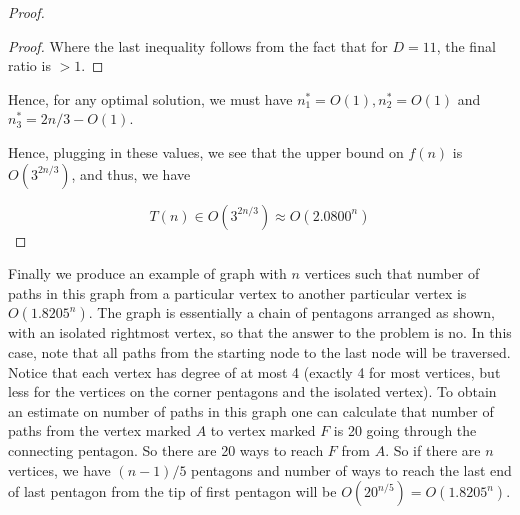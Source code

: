 \documentclass[answers]{exam}
\begin{document}
\begin{questions}
\begin{solution}
\begin{proof}
\begin{proof}
    Where the last inequality follows from the fact that for $D = 11$, the final ratio is $>1$.
\end{proof}

Hence, for any optimal solution, we must have $n_1^* = O(1), n_2^* = O(1)$ and $n_3^* = 2n/3 - O(1)$.

Hence, plugging in these values, we see that the upper bound on $f(n)$ is $O(3^{2n/3})$, and thus, we have

\[
    T(n) \in O(3^{2n/3}) \approx O(2.0800^n)
\]
\end{proof}
Finally we produce an example of graph with $n$ vertices such that number of paths in this graph from a particular vertex to another particular vertex is $O(1.8205^n)$. The graph is essentially a chain of pentagons arranged as shown, with an isolated rightmost vertex, so that the answer to the problem is no. In this case, note that all paths from the starting node to the last node will be traversed. Notice that each vertex has degree of at most 4 (exactly 4 for most vertices, but less for the vertices on the corner pentagons and the isolated vertex). To obtain an estimate on number of paths in this graph one can calculate that number of paths from the vertex marked $A$ to vertex marked $F$ is 20 going through the connecting pentagon. So there are 20 ways to reach $F$ from $A$. So if there are $n$ vertices, we have $(n - 1)/5$ pentagons and number of ways to reach the last end of last pentagon from the tip of first pentagon will be $O(20^{n/5}) = O(1.8205^n)$.

\begin{center}
\end{center}
\end{solution}
\end{questions}
\end{document}
